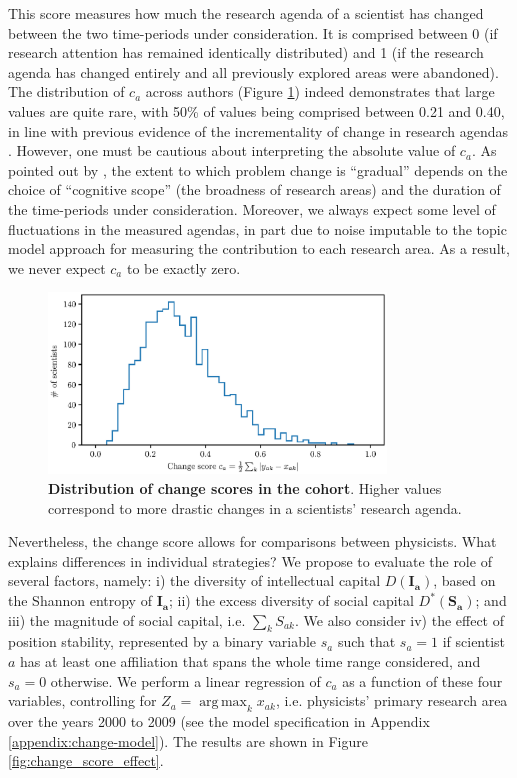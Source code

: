 \documentclass{article}
\DeclareMathOperator*{\argmax}{arg\,max}
\begin{document}
This score measures how much the research agenda of a scientist has changed between the two time-periods under consideration. It is comprised between 0 (if research attention has remained identically distributed) and 1 (if the research agenda has changed entirely and all previously explored areas were abandoned). The distribution of $c_a$ across authors (Figure \ref{fig:change_scores}) indeed demonstrates that large values are quite rare, with 50\% of values being comprised between 0.21 and 0.40, in line with previous evidence of the incrementality of change in research agendas \citep{Gieryn1978,Jia2017,Aleta2019}. However, one must be cautious about interpreting the absolute value of $c_a$. As pointed out by \citet{Gieryn1978}, the extent to which problem change is ``gradual'' depends on the choice of ``cognitive scope'' (the broadness of research areas) and the duration of the time-periods under consideration.  Moreover, we always expect some level of fluctuations in the measured agendas, in part due to noise imputable to the topic model approach for measuring the contribution to each research area. As a result, we never expect $c_a$ to be exactly zero.

\begin{figure}[h]
    \centering
        \includegraphics[width=0.8\textwidth]{plots/change_score.eps}
    \caption{\textbf{Distribution of change scores in the cohort}. Higher values correspond to more drastic changes in a scientists' research agenda.}    
    \label{fig:change_scores}
\end{figure}

Nevertheless, the change score allows for comparisons between physicists. What explains differences in individual strategies? We propose to evaluate the role of several factors, namely: i) the diversity of intellectual capital $D(\bm{I_a})$, based on the Shannon entropy of $\bm{I_a}$; ii) the excess diversity of social capital $D^{\ast}(\bm{S_a})$; and iii) the magnitude of social capital, i.e. $\sum_k S_{ak}$. We also consider iv) the effect of position stability, represented by a binary variable $s_a$ such that $s_a=1$ if scientist $a$ has at least one affiliation that spans the whole time range considered, and $s_a=0$ otherwise. We perform a linear regression of $c_a$ as a function of these four variables, controlling for $Z_a=\argmax_{k} x_{ak}$, i.e. physicists' primary research area over the years 2000 to 2009 (see the model specification in Appendix \ref{appendix:change-model}). The results are shown in Figure \ref{fig:change_score_effect}.
\end{document}
